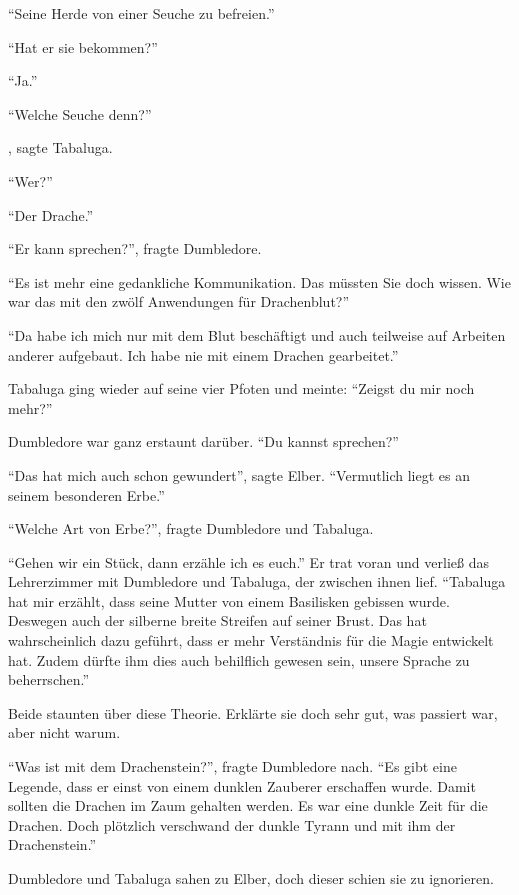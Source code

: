 \enquote{Seine Herde von einer Seuche zu befreien.}

\enquote{Hat er sie bekommen?}

\enquote{Ja.}

\enquote{Welche Seuche denn?}

, sagte Tabaluga.

\enquote{Wer?}


\enquote{Der Drache.}

\enquote{Er kann sprechen?}, fragte Dumbledore.

\enquote{Es ist mehr eine gedankliche Kommunikation. Das müssten Sie doch wissen. Wie war das mit den zwölf Anwendungen für Drachenblut?}

\enquote{Da habe ich mich nur mit dem Blut beschäftigt und auch teilweise auf Arbeiten anderer aufgebaut. Ich habe nie mit einem Drachen gearbeitet.}

Tabaluga ging wieder auf seine vier Pfoten und meinte: \enquote{Zeigst du mir noch mehr?}

Dumbledore war ganz erstaunt darüber. \enquote{Du kannst sprechen?}

\enquote{Das hat mich auch schon gewundert}, sagte Elber. \enquote{Vermutlich liegt es an seinem besonderen Erbe.}

\enquote{Welche Art von Erbe?}, fragte Dumbledore und Tabaluga.

\enquote{Gehen wir ein Stück, dann erzähle ich es euch.} Er trat voran und verließ das Lehrerzimmer mit Dumbledore und Tabaluga, der zwischen ihnen lief. \enquote{Tabaluga hat mir erzählt, dass seine Mutter von einem Basilisken gebissen wurde. Deswegen auch der silberne breite Streifen auf seiner Brust. Das hat wahrscheinlich dazu geführt, dass er mehr Verständnis für die Magie entwickelt hat. Zudem dürfte ihm dies auch behilflich gewesen sein, unsere Sprache zu beherrschen.}

Beide staunten über diese Theorie. Erklärte sie doch sehr gut, was passiert war, aber nicht warum.

\enquote{Was ist mit dem Drachenstein?}, fragte Dumbledore nach. \enquote{Es gibt eine Legende, dass er einst von einem dunklen Zauberer erschaffen wurde. Damit sollten die Drachen im Zaum gehalten werden. Es war eine dunkle Zeit für die Drachen. Doch plötzlich verschwand der dunkle Tyrann und mit ihm der Drachenstein.}

Dumbledore und Tabaluga sahen zu Elber, doch dieser schien sie zu ignorieren.

